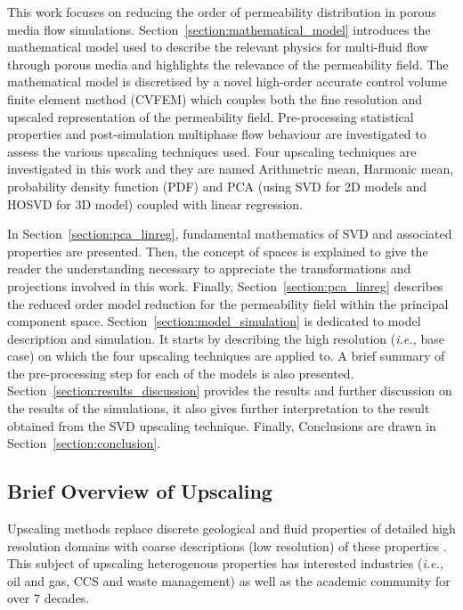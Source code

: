\documentclass[preprint,12pt]{elsarticle}
\newcommand{\ie}{{\it i.e., }}
\begin{document}
\bigskip
This work focuses on reducing the order of permeability distribution in porous media flow simulations. Section~\ref{section:mathematical_model} introduces the mathematical model used to describe the relevant physics for multi-fluid flow through porous media and highlights the relevance of the permeability field. The mathematical model is discretised by a novel high-order accurate control volume finite element method (CVFEM) \cite{Gomes_2017} which couples both the fine resolution and upscaled representation of the permeability field. Pre-processing statistical properties and post-simulation multiphase flow behaviour are investigated to assess the various upscaling techniques used. Four upscaling techniques are investigated in this work and they are named Arithmetric mean, Harmonic mean, probability density function (PDF) and PCA (using SVD for 2D models and HOSVD for 3D model) coupled with linear regression.

In Section~\ref{section:pca_linreg}, fundamental mathematics of SVD and associated properties are presented. Then, the concept of spaces is explained to give the reader the understanding necessary to appreciate the transformations and projections involved in this work. Finally, Section~\ref{section:pca_linreg} describes the reduced order model reduction for the permeability field within the principal component space. Section~\ref{section:model_simulation} is dedicated to model description and simulation. It starts by describing the high resolution (\ie base case) on which the four upscaling techniques are applied to. A brief summary of the pre-processing step for each of the models is also presented. Section~\ref{section:results_discussion} provides the results and further discussion on the results of the simulations, it also gives further interpretation to the result obtained from the SVD upscaling technique. Finally, Conclusions are drawn in Section~\ref{section:conclusion}.

\subsection{Brief Overview of Upscaling}\label{section:overview_upscaling}

Upscaling methods replace discrete geological and fluid properties of detailed high resolution domains with coarse descriptions (low resolution) of these properties \cite{Vereecken_2007}. This subject of upscaling heterogenous properties has interested industries (\ie oil and gas, CCS and waste management) as well as the academic community for over $7$ decades.
\end{document}
